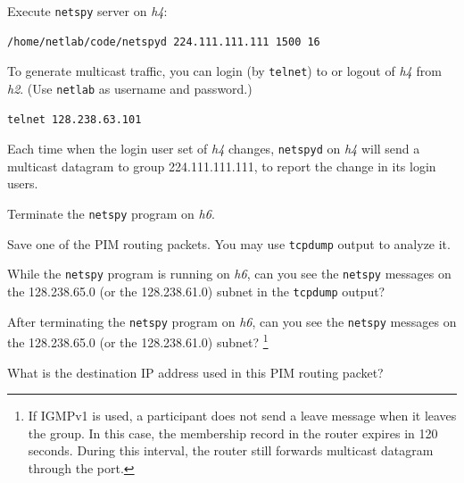 \documentclass{../UTNetLab}
\begin{document}
    Execute \lstinline{netspy} server on \textit{h4}:
    \begin{lstlisting}
/home/netlab/code/netspyd 224.111.111.111 1500 16
    \end{lstlisting}
    
    To generate multicast traffic, you can login (by \lstinline{telnet}) to or logout of \textit{h4} from \textit{h2}. (Use \texttt{netlab} as username and password.)
    \begin{lstlisting}
telnet 128.238.63.101
    \end{lstlisting}

    Each time when the login user set of \textit{h4} changes, \lstinline{netspyd} on \textit{h4} will send a multicast datagram to group 224.111.111.111, to report the change in its login users.

    Terminate the \lstinline{netspy} program on \textit{h6}.

    Save one of the PIM routing packets.
    You may use \lstinline{tcpdump} output to analyze it.
    
    \begin{report}
    \item While the \lstinline{netspy} program is running on \textit{h6},
    can you see the \lstinline{netspy} messages on the 128.238.65.0 (or the 128.238.61.0) subnet in the \lstinline{tcpdump} output?

    \item After terminating the \lstinline{netspy} program on \textit{h6},
    can you see the \lstinline{netspy} messages on the 128.238.65.0 (or the 128.238.61.0) subnet?%
    \footnote{If IGMPv1 is used, a participant does not send a leave message when it leaves the group.
    In this case, the membership record in the router expires in 120 seconds.
    During this interval, the router still forwards multicast datagram through the port.} 

    \item What is the destination IP address used in this PIM routing packet?
    \end{report}
\end{document}
